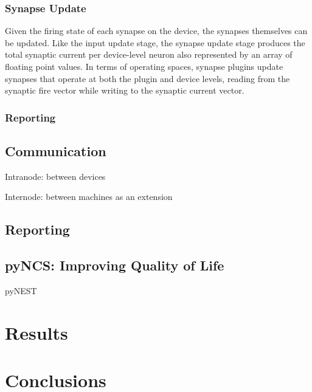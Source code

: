 \subsubsection{Synapse Update}

Given the firing state of each synapse on the device,
the synapses themselves can be updated. Like the input update stage, the
synapse update stage produces the total synaptic current per device-level
neuron also represented by an array of floating point values. In terms
of operating spaces, synapse plugins update synapses that operate at
both the plugin and device levels, reading from the synaptic fire vector
while writing to the synaptic current vector.

\subsubsection{Reporting}

\subsection{Communication}
Intranode: between devices

Internode: between machines as an extension

\subsection{Reporting}
\subsection{pyNCS: Improving Quality of Life}

\cite{pynest} pyNEST

\section{Results}

\section{Conclusions}
